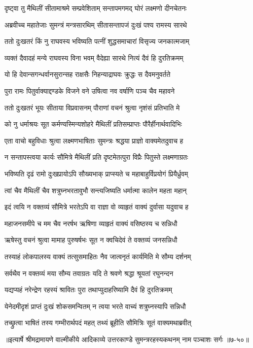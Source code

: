 
\twolineshloka
{दृष्ट्वा तु मैथिलीं सीतामाश्रमे सम्प्रवेशिताम्}
{सन्तापमगमद् घोरं लक्ष्मणो दीनचेतनः} %

\twolineshloka
{अब्रवीच्च महातेजाः सुमन्त्रं मन्त्रसारथिम्}
{सीतासन्तापजं दुःखं पश्य रामस्य सारथे} %

\twolineshloka
{ततो दुःखतरं किं नु राघवस्य भविष्यति}
{पत्नीं शुद्धसमाचारां विसृज्य जनकात्मजाम्} %

\twolineshloka
{व्यक्तं दैवादहं मन्ये राघवस्य विना भवम्}
{वैदेह्या सारथे नित्यं दैवं हि दुरतिक्रमम्} %

\twolineshloka
{यो हि देवान्सगन्धर्वानसुरान्सह राक्षसैः}
{निहन्याद्राघवः क्रुद्धः स दैवमनुवर्तते} %

\twolineshloka
{पुरा रामः पितुर्वाक्याद्दण्डके विजने वने}
{उषित्वा नव वर्षाणि पञ्च चैव महावने} %

\twolineshloka
{ततो दुःखतरं भूयः सीताया विप्रवासनम्}
{पौराणां वचनं श्रुत्वा नृशंसं प्रतिभाति मे} %

\twolineshloka
{को नु धर्माश्रयः सूत कर्मण्यस्मिन्यशोहरे}
{मैथिलीं प्रतिसम्प्राप्तः पौरैर्हीनार्थवादिभिः} %

\twolineshloka
{एता वाचो बहुविधाः श्रुत्वा लक्ष्मणभाषिताः}
{सुमन्त्रः श्रद्धया प्राज्ञो वाक्यमेतदुवाच ह} %

\twolineshloka
{न सन्तापस्त्वया कार्यः सौमित्रे मैथिलीं प्रति}
{दृष्टमेतत्पुरा विप्रैः पितुस्ते लक्ष्मणाग्रतः} %

\twolineshloka
{भविष्यति दृढं रामो दुःखप्रायोऽपि सौख्यभाक्}
{प्राप्स्यते च महाबाहुर्विप्रयोगं प्रियैर्ध्रुवम्} %

\twolineshloka
{त्वां चैव मैथिलीं चैव शत्रुघ्नभरतावुभौ}
{सन्त्यजिष्यति धर्मात्मा कालेन महता महान्} %

\twolineshloka
{इदं त्वयि न वक्तव्यं सौमित्रे भरतेऽपि वा}
{राज्ञा वो व्याहृतं वाक्यं दुर्वासा यदुवाच ह} %

\twolineshloka
{महाजनसमीपे च मम चैव नरर्षभ}
{ऋषिणा व्याहृतं वाक्यं वसिष्ठस्य च सन्निधौ} %

\twolineshloka
{ऋषेस्तु वचनं श्रुत्वा मामाह पुरुषर्षभः}
{सूत न क्वचिदेवं ते वक्तव्यं जनसन्निधौ} %

\twolineshloka
{तस्याहं लोकपालस्य वाक्यं तत्सुसमाहितः}
{नैव जात्वनृतं कार्यमिति मे सौम्य दर्शनम्} %

\twolineshloka
{सर्वथैव न वक्तव्यं मया सौम्य तवाग्रतः}
{यदि ते श्रवणे श्रद्धा श्रूयतां रघुनन्दन} %

\twolineshloka
{यद्यप्यहं नरेन्द्रेण रहस्यं श्रावितः पुरा}
{तथाप्युदाहरिष्यामि दैवं हि दुरतिक्रमम्} %

\twolineshloka
{येनेदमीदृशं प्राप्तं दुःखं शोकसमन्वितम्}
{न त्वया भरते वाच्यं शत्रुघ्नस्यापि सन्निधौ} %

\twolineshloka
{तच्छ्रुत्वा भाषितं तस्य गम्भीरार्थपदं महत्}
{तथ्यं ब्रूहीति सौमित्रिः सूतं वाक्यमथाब्रवीत्} %


॥इत्यार्षे श्रीमद्रामायणे वाल्मीकीये आदिकाव्ये उत्तरकाण्डे सुमन्त्ररहस्यकथनम् नाम पञ्चाशः सर्गः ॥७-५०॥
